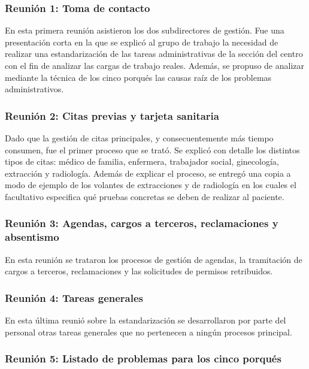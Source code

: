 \subsubsection{Reunión 1: Toma de contacto}

En esta primera reunión asistieron los dos subdirectores de gestión. Fue una presentación corta en la que se explicó al grupo de trabajo la necesidad de realizar una estandarización de las tareas administrativas de la sección del centro con el fin de analizar las cargas de trabajo reales. Además, se propuso de analizar mediante la técnica de los cinco porqués las causas raíz de los problemas administrativos.

\subsubsection{Reunión 2: Citas previas y tarjeta sanitaria}

Dado que la gestión de citas principales, y consecuentemente más tiempo consumen, fue el primer proceso que se trató. Se explicó con detalle los distintos tipos de citas: médico de familia, enfermera, trabajador social, ginecología, extracción y radiología. Además de explicar el proceso, se entregó una copia a modo de ejemplo de los volantes de extracciones y de radiología en los cuales el facultativo especifica qué pruebas concretas se deben de realizar al paciente.

\subsubsection{Reunión 3: Agendas, cargos a terceros, reclamaciones y absentismo}

En esta reunión se trataron los procesos de gestión de agendas, la tramitación de cargos a terceros, reclamaciones y las solicitudes de permisos retribuidos.

\subsubsection{Reunión 4: Tareas generales}

En esta última reunió sobre la estandarización se desarrollaron por parte del personal otras tareas generales que no pertenecen a ningún procesos principal.

\subsubsection{Reunión 5: Listado de problemas para los cinco porqués}

